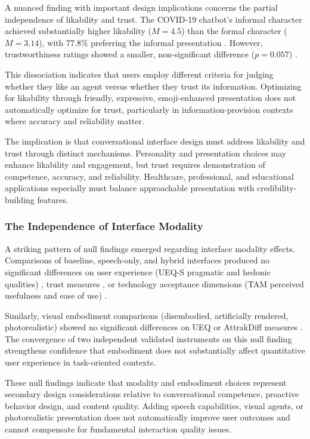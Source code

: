 \documentclass[manuscript,anonymous,sigconf]{acmart}
\begin{document}
A nuanced finding with important design implications concerns the partial independence of likability and trust. The COVID-19 chatbot's informal character achieved substantially higher likability ($M = 4.5$) than the formal character ($M = 3.14$), with 77.8\% preferring the informal presentation \cite{A79}. However, trustworthiness ratings showed a smaller, non-significant difference ($p = 0.057$) \cite{A79}.

This dissociation indicates that users employ different criteria for judging whether they like an agent versus whether they trust its information. Optimizing for likability through friendly, expressive, emoji-enhanced presentation does not automatically optimize for trust, particularly in information-provision contexts where accuracy and reliability matter.

The implication is that conversational interface design must address likability and trust through distinct mechanisms. Personality and presentation choices may enhance likability and engagement, but trust requires demonstration of competence, accuracy, and reliability. Healthcare, professional, and educational applications especially must balance approachable presentation with credibility-building features.

\subsubsection{The Independence of Interface Modality}

A striking pattern of null findings emerged regarding interface modality effects. Comparisons of baseline, speech-only, and hybrid interfaces produced no significant differences on user experience (UEQ-S pragmatic and hedonic qualities) \cite{A15}, trust measures \cite{A15}, or technology acceptance dimensions (TAM perceived usefulness and ease of use) \cite{A15}.

Similarly, visual embodiment comparisons (disembodied, artificially rendered, photorealistic) showed no significant differences on UEQ or AttrakDiff measures \cite{A86}. The convergence of two independent validated instruments on this null finding strengthens confidence that embodiment does not substantially affect quantitative user experience in task-oriented contexts.

These null findings indicate that modality and embodiment choices represent secondary design considerations relative to conversational competence, proactive behavior design, and content quality. Adding speech capabilities, visual agents, or photorealistic presentation does not automatically improve user outcomes and cannot compensate for fundamental interaction quality issues.
\end{document}
